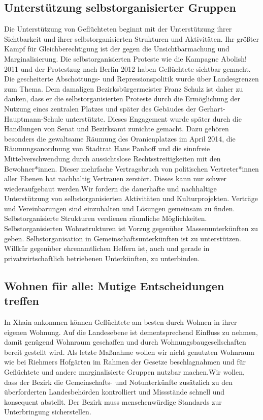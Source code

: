 \documentclass[a4paper,10pt]{article}
\begin{document}
\subsection*{\ttfamily Unterstützung selbstorganisierter
Gruppen}\label{unterstuxfctzung-selbstorganisierter-gruppen}

Die Unterstützung von Geflüchteten beginnt mit der Unterstützung ihrer
Sichtbarkeit und ihrer selbstorganisierten Strukturen und Aktivitäten.
Ihr größter Kampf für Gleichberechtigung ist der gegen die
Unsichtbarmachung und Marginalisierung. Die selbstorganisierten Proteste
wie die Kampagne \mbox{Abolish!} 2011 und der Protestzug nach Berlin 2012 haben
Geflüchtete sichtbar gemacht. Die gescheiterte Ab\-schot\-tungs- und
Repressionspolitik wurde über Landesgrenzen zum Thema. Dem damaligen
Bezirksbürgermeister Franz Schulz ist daher zu danken, dass er die
selbstorganisierten Proteste durch die Ermöglichung der Nutzung eines
zentralen Platzes und später des Gebäudes der Gerhart-Hauptmann-Schule
unterstützte. Dieses Engagement wurde später durch die Handlungen von
Senat und Bezirksamt zunichte gemacht. Dazu gehören besonders die
gewaltsame Räumung des Oranienplatzes im April 2014, die
Räumungsanordnung von Stadtrat Hans Panhoff und die sinnfreie
Mittelverschwendung durch aussichtslose Rechtsstreitigkeiten mit den
Bewohner*innen. Dieser mehrfache Vertragsbruch von politischen
Vertreter*innen aller Ebenen hat nachhaltig Vertrauen zerstört. Dieses
kann nur schwer wiederaufgebaut werden.Wir fordern die dauerhafte und
nachhaltige Unterstützung von selbstorganisierten Aktivitäten und
Kulturprojekten. Verträge und Vereinbarungen sind einzuhalten und
Lösungen gemeinsam zu finden. Selbstorganisierte Strukturen verdienen
räumliche Möglichkeiten. Selbstorganisierten Wohnstrukturen ist Vorzug
gegenüber Massenunterkünften zu geben. Selbstorganisation in
Gemeinschaftsunterkünften ist zu unterstützen. Willkür gegenüber
ehrenamtlichen Helfern ist, auch und gerade in privatwirtschaftlich
betriebenen Unterkünften, zu unterbinden.

\subsection*{\ttfamily Wohnen für alle: Mutige Entscheidungen
treffen}\label{wohnen-fuxfcr-alle-mutige-entscheidungen-treffen}

In Xhain ankommen können Geflüchtete am besten durch Wohnen in ihrer
eigenen Wohnung. Auf die Landesebene ist dementsprechend Einfluss zu
nehmen, damit genügend Wohnraum geschaffen und durch
Wohnungsbaugesellschaften bereit gestellt wird. Als letzte Maßnahme
wollen wir nicht genutzten Wohnraum wie bei Riehmers Hofgärten im Rahmen
der Gesetze beschlagnahmen und für Geflüchtete und andere
marginalisierte Gruppen nutzbar machen.Wir wollen, dass der Bezirk die
Gemeinschafts- und Notunterkünfte zusätzlich zu den überforderten
Landesbehörden kontrolliert und Missstände schnell und konsequent
abstellt. Der Bezirk muss menschenwürdige Standards zur Unterbringung
sicherstellen.
\end{document}
